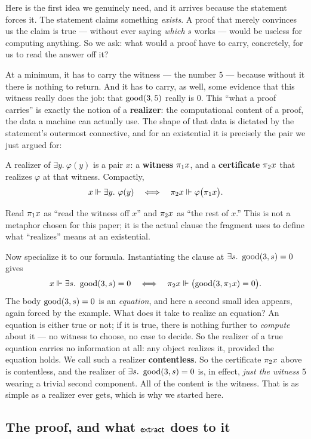 \documentclass[11pt]{article}
\begin{document}
Here is the first idea we genuinely need, and it arrives because the
statement forces it. The statement claims something \emph{exists}. A proof
that merely convinces us the claim is true --- without ever saying
\emph{which} $s$ works --- would be useless for computing anything. So we
ask: what would a proof have to carry, concretely, for us to read the answer
off it?

At a minimum, it has to carry the witness --- the number $5$ --- because
without it there is nothing to return. And it has to carry, as well, some
evidence that this witness really does the job: that $\operatorname{good}(3,5)$ really is
$0$. This ``what a proof carries'' is exactly the notion of a
\textbf{realizer}: the computational content of a proof, the data a machine
can actually use. The shape of that data is dictated by the statement's
outermost connective, and for an existential it is precisely the pair we
just argued for:
\begin{keystmt}
A realizer of $\exists y.\ \varphi(y)$ is a pair $x$: a \textbf{witness}
$\pi_1 x$, and a \textbf{certificate} $\pi_2 x$ that realizes $\varphi$ at that
witness. Compactly,
\[
  x \Vdash \exists y.\ \varphi(y)
  \quad\Longleftrightarrow\quad
  \pi_2 x \Vdash \varphi\bigl(\pi_1 x\bigr).
\]
\end{keystmt}
Read $\pi_1 x$ as ``read the witness off $x$'' and $\pi_2 x$ as ``the rest of
$x$.'' This is not a metaphor chosen for this paper; it is the actual clause
the fragment uses to define what ``realizes'' means at an existential.

Now specialize it to our formula. Instantiating the clause at
$\exists s.\ \good(3,s)=0$ gives
\[
  x \Vdash \exists s.\ \operatorname{good}(3,s)=0
  \quad\Longleftrightarrow\quad
  \pi_2 x \Vdash \bigl(\operatorname{good}(3,\pi_1 x)=0\bigr).
\]
The body $\operatorname{good}(3,s)=0$ is an \emph{equation}, and here a second small idea
appears, again forced by the example. What does it take to realize an
equation? An equation is either true or not; if it is true, there is nothing
further to \emph{compute} about it --- no witness to choose, no case to
decide. So the realizer of a true equation carries no information at all: any
object realizes it, provided the equation holds. We call such a realizer
\textbf{contentless}. So the certificate $\pi_2 x$ above is contentless, and
the realizer of $\exists s.\ \good(3,s)=0$ is, in effect, \emph{just the
witness $5$} wearing a trivial second component. All of the content is the
witness. That is as simple as a realizer ever gets, which is why we started
here.

\subsection*{The proof, and what \texorpdfstring{$\mathsf{extract}$}{extract} does to it}
\end{document}
